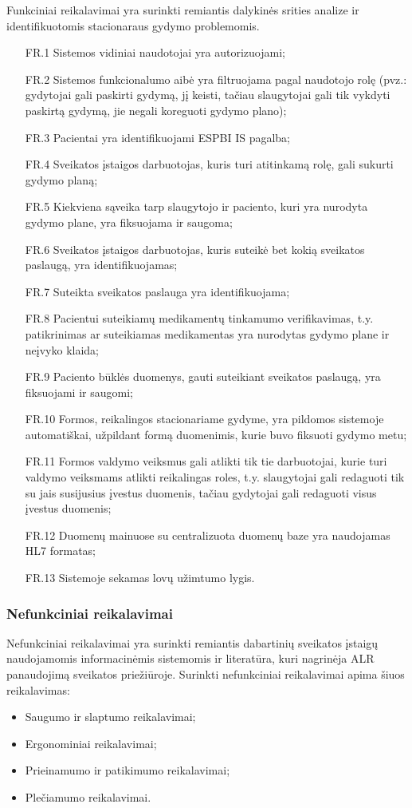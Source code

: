 Funkciniai reikalavimai yra surinkti remiantis dalykinės srities analize ir identifikuotomis stacionaraus gydymo problemomis.
\begin{itemize}
    \item [FR.1] Sistemos vidiniai naudotojai yra autorizuojami;
    \item [FR.2] Sistemos funkcionalumo aibė yra filtruojama pagal naudotojo rolę (pvz.: gydytojai gali paskirti gydymą, jį keisti, tačiau slaugytojai gali tik vykdyti paskirtą gydymą, jie negali koreguoti gydymo plano);
    \item [FR.3] Pacientai yra identifikuojami ESPBI IS pagalba;
    \item [FR.4] Sveikatos įstaigos darbuotojas, kuris turi atitinkamą rolę, gali sukurti gydymo planą;
    \item [FR.5] Kiekviena sąveika tarp slaugytojo ir paciento, kuri yra nurodyta gydymo plane, yra fiksuojama ir saugoma;
    \item [FR.6] Sveikatos įstaigos darbuotojas, kuris suteikė bet kokią sveikatos paslaugą, yra identifikuojamas;
    \item [FR.7] Suteikta sveikatos paslauga yra identifikuojama;
    \item [FR.8] Pacientui suteikiamų medikamentų tinkamumo verifikavimas, t.y. patikrinimas ar suteikiamas medikamentas yra nurodytas gydymo plane ir neįvyko klaida;
    \item [FR.9] Paciento būklės duomenys, gauti suteikiant sveikatos paslaugą, yra fiksuojami ir saugomi;
    \item [FR.10] Formos, reikalingos stacionariame gydyme, yra pildomos sistemoje automatiškai, užpildant formą duomenimis, kurie buvo fiksuoti gydymo metu;
    \item [FR.11] Formos valdymo veiksmus gali atlikti tik tie darbuotojai, kurie turi valdymo veiksmams atlikti reikalingas roles, t.y. slaugytojai gali redaguoti tik su jais susijusius įvestus duomenis, tačiau gydytojai gali redaguoti visus įvestus duomenis;
    \item [FR.12] Duomenų mainuose su centralizuota duomenų baze yra naudojamas HL7 formatas;
    \item [FR.13] Sistemoje sekamas lovų užimtumo lygis.
\end{itemize}

\subsubsection{Nefunkciniai reikalavimai}
Nefunkciniai reikalavimai yra surinkti remiantis dabartinių sveikatos įstaigų naudojamomis informacinėmis sistemomis ir literatūra, kuri nagrinėja ALR panaudojimą sveikatos priežiūroje. Surinkti nefunkciniai reikalavimai apima šiuos reikalavimas:
\begin{itemize}
    \item Saugumo ir slaptumo reikalavimai;
    \item Ergonominiai reikalavimai;
    \item Prieinamumo ir patikimumo reikalavimai;
    \item Plečiamumo reikalavimai.
\end{itemize}

